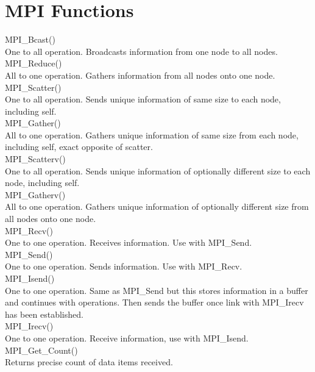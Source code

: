 \documentclass[a4paper,norsk,11pt,twoside]{report}
\begin{document}
\section{MPI Functions}

MPI\_Bcast() \\
One to all operation. Broadcasts information from one node to all nodes. \\

MPI\_Reduce() \\
All to one operation. Gathers information from all nodes onto one node. \\

MPI\_Scatter() \\
One to all operation. Sends unique information of same size to each node, including self. \\

MPI\_Gather() \\
All to one operation. Gathers unique information of same size from each node, including self, exact opposite of scatter. \\

MPI\_Scatterv() \\
One to all operation. Sends unique information of optionally different size to each node, including self. \\

MPI\_Gatherv() \\
All to one operation. Gathers unique information of optionally different size from all nodes onto one node. \\

MPI\_Recv() \\
One to one operation. Receives information. Use with MPI\_Send. \\

MPI\_Send() \\
One to one operation. Sends information. Use with MPI\_Recv. \\

MPI\_Isend() \\
One to one operation. Same as MPI\_Send but this stores information in a buffer and continues with operations. Then sends the buffer once link with MPI\_Irecv has been established. \\

MPI\_Irecv() \\
One to one operation. Receive information, use with MPI\_Isend. \\

MPI\_Get\_Count() \\
Returns precise count of data items received. \\
\end{document}
